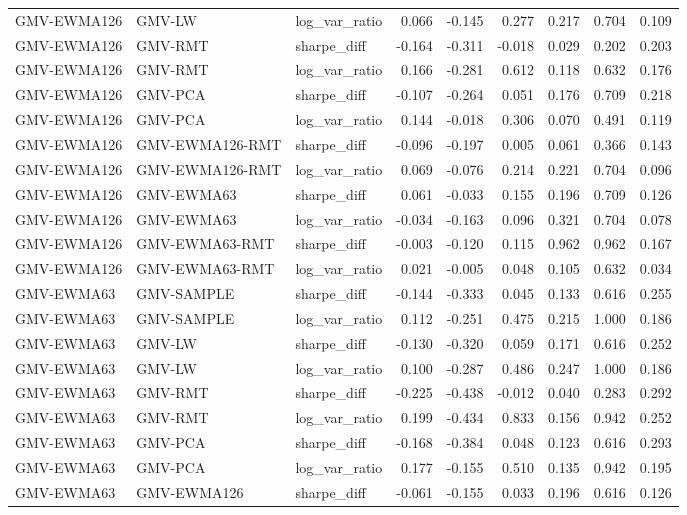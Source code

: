 \begin{table}[t]
{\begin{tabular}{lllrrrrrr}
GMV-EWMA126 & GMV-LW & log\_var\_ratio & 0.066 & -0.145 & 0.277 & 0.217 & 0.704 & 0.109 \\
GMV-EWMA126 & GMV-RMT & sharpe\_diff & -0.164 & -0.311 & -0.018 & 0.029 & 0.202 & 0.203 \\
GMV-EWMA126 & GMV-RMT & log\_var\_ratio & 0.166 & -0.281 & 0.612 & 0.118 & 0.632 & 0.176 \\
GMV-EWMA126 & GMV-PCA & sharpe\_diff & -0.107 & -0.264 & 0.051 & 0.176 & 0.709 & 0.218 \\
GMV-EWMA126 & GMV-PCA & log\_var\_ratio & 0.144 & -0.018 & 0.306 & 0.070 & 0.491 & 0.119 \\
GMV-EWMA126 & GMV-EWMA126-RMT & sharpe\_diff & -0.096 & -0.197 & 0.005 & 0.061 & 0.366 & 0.143 \\
GMV-EWMA126 & GMV-EWMA126-RMT & log\_var\_ratio & 0.069 & -0.076 & 0.214 & 0.221 & 0.704 & 0.096 \\
GMV-EWMA126 & GMV-EWMA63 & sharpe\_diff & 0.061 & -0.033 & 0.155 & 0.196 & 0.709 & 0.126 \\
GMV-EWMA126 & GMV-EWMA63 & log\_var\_ratio & -0.034 & -0.163 & 0.096 & 0.321 & 0.704 & 0.078 \\
GMV-EWMA126 & GMV-EWMA63-RMT & sharpe\_diff & -0.003 & -0.120 & 0.115 & 0.962 & 0.962 & 0.167 \\
GMV-EWMA126 & GMV-EWMA63-RMT & log\_var\_ratio & 0.021 & -0.005 & 0.048 & 0.105 & 0.632 & 0.034 \\
GMV-EWMA63 & GMV-SAMPLE & sharpe\_diff & -0.144 & -0.333 & 0.045 & 0.133 & 0.616 & 0.255 \\
GMV-EWMA63 & GMV-SAMPLE & log\_var\_ratio & 0.112 & -0.251 & 0.475 & 0.215 & 1.000 & 0.186 \\
GMV-EWMA63 & GMV-LW & sharpe\_diff & -0.130 & -0.320 & 0.059 & 0.171 & 0.616 & 0.252 \\
GMV-EWMA63 & GMV-LW & log\_var\_ratio & 0.100 & -0.287 & 0.486 & 0.247 & 1.000 & 0.186 \\
GMV-EWMA63 & GMV-RMT & sharpe\_diff & -0.225 & -0.438 & -0.012 & 0.040 & 0.283 & 0.292 \\
GMV-EWMA63 & GMV-RMT & log\_var\_ratio & 0.199 & -0.434 & 0.833 & 0.156 & 0.942 & 0.252 \\
GMV-EWMA63 & GMV-PCA & sharpe\_diff & -0.168 & -0.384 & 0.048 & 0.123 & 0.616 & 0.293 \\
GMV-EWMA63 & GMV-PCA & log\_var\_ratio & 0.177 & -0.155 & 0.510 & 0.135 & 0.942 & 0.195 \\
GMV-EWMA63 & GMV-EWMA126 & sharpe\_diff & -0.061 & -0.155 & 0.033 & 0.196 & 0.616 & 0.126 \\

\end{tabular}}
\end{table}

